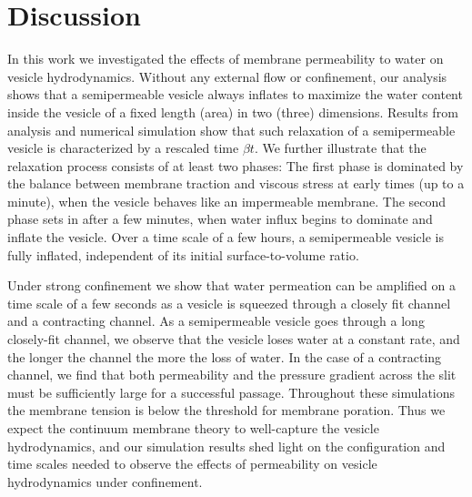 \documentclass[9pt,twocolumn,twoside,lineno]{pnas-new}
\begin{document}
%


\section*{Discussion}
In this work we investigated the effects of membrane permeability to
water on vesicle hydrodynamics. Without any external flow or
confinement, our analysis shows that a semipermeable vesicle always
inflates to maximize the water content inside the vesicle of a fixed
length (area) in two (three) dimensions. Results from analysis and
numerical simulation show that such relaxation of a semipermeable
vesicle is characterized by a rescaled time $\beta t$. We further
illustrate that the relaxation process consists of at least two phases:
The first phase is dominated by the balance between membrane traction
and viscous stress at early times (up to a minute), when the vesicle
behaves like an impermeable membrane. The second phase sets in after a
few minutes, when water influx begins to dominate and inflate the
vesicle. Over a time scale of a few hours, a semipermeable vesicle is
fully inflated, independent of its initial surface-to-volume ratio.

Under strong confinement we show that water permeation can be amplified
on a time scale of a few seconds as a vesicle is squeezed through a
closely fit channel and a contracting channel. As a semipermeable
vesicle goes through a long closely-fit channel, we observe that the
vesicle loses water at a constant rate, and the longer the channel the
more the loss of water. In the case of a contracting channel, we find
that both permeability and the pressure gradient across the slit must be
sufficiently large for a successful passage. Throughout these
simulations the membrane tension is below the threshold for membrane
poration. Thus we expect the continuum membrane theory to well-capture
the vesicle hydrodynamics, and our simulation results shed light on the
configuration and time scales needed to observe the effects of
permeability on vesicle hydrodynamics under confinement. 
\end{document}
